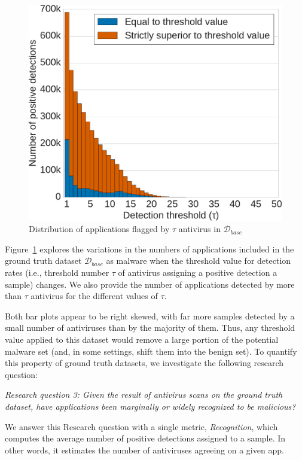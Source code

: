 \begin{figure}[!ht]
	\centering
	\includegraphics[width=0.75\linewidth]{figures/stase/recognition.pdf}
        \caption[Distribution of applications flagged by antivirus]{Distribution of applications flagged by $\tau$ antivirus in $\mathcal{D}_{base}$}
	\label{figure:stase:recognition}
\end{figure}

Figure~\ref{figure:stase:recognition} explores the variations in the numbers of applications included in the ground truth dataset $\mathcal{D}_{base}$ as malware when the threshold value for detection rates (i.e., threshold number $\tau$ of antivirus assigning a positive detection a sample) changes.
We also provide the number of applications detected by more than $\tau$ antivirus for the different values of $\tau$.

Both bar plots appear to be right skewed, with far more samples detected by a small number of antiviruses than by the majority of them.
Thus, any threshold value applied to this dataset would remove a large portion of the potential malware set (and, in some settings, shift them into the benign set).
To quantify this property of ground truth datasets, we investigate the following research question:

\begin{mdframed}[roundcorner=10pt,nobreak=true]
	{\em Research question 3: Given the result of antivirus scans on the ground truth dataset, have applications been marginally or widely recognized to be malicious?}
\end{mdframed}

We answer this Research question with a single metric, {\em Recognition}, which computes the average number of positive detections assigned to a sample.
In other words, it estimates the number of antiviruses agreeing on a given app.

